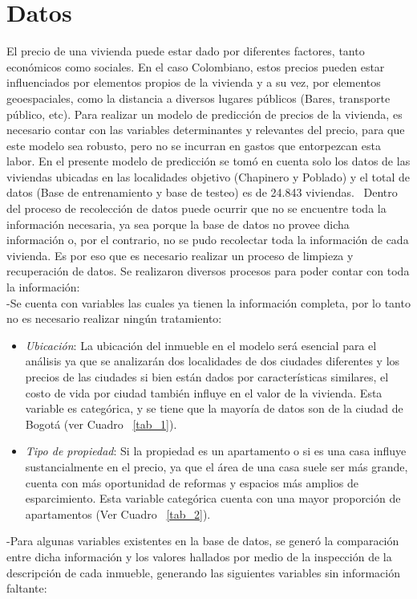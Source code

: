 \documentclass[conference, 10pt]{IEEEtran}
\begin{document}
\section{Datos} \label{AA}

El precio de una vivienda puede estar dado por diferentes factores, tanto económicos como sociales. En el caso Colombiano, estos precios pueden estar influenciados por elementos propios de la vivienda y a su vez, por elementos geoespaciales, como la distancia a diversos lugares públicos (Bares, transporte público, etc). Para realizar un modelo de predicción de precios de la vivienda, es necesario contar con las variables determinantes y relevantes del precio, para que este modelo sea robusto, pero no se incurran en gastos que entorpezcan esta labor. En el presente modelo de predicción se tomó en cuenta solo los datos de  las viviendas ubicadas en las localidades objetivo (Chapinero y Poblado) y el total de datos (Base de entrenamiento y base de testeo) es de 24.843 viviendas. \
Dentro del proceso de recolección de datos puede ocurrir que no se encuentre toda la información necesaria, ya sea porque la base de datos no provee dicha información o, por el contrario, no se pudo recolectar toda la información de cada vivienda. Es por eso que es necesario realizar un proceso de limpieza y recuperación de datos. Se realizaron diversos procesos para poder contar con toda la información:\\ 
-Se cuenta con variables las cuales ya tienen la información completa, por lo tanto no es necesario realizar ningún tratamiento:
\begin{itemize}
\item \textit{Ubicación}: La ubicación del inmueble en el modelo será esencial para el análisis ya que se analizarán dos localidades de dos ciudades diferentes y los precios de las ciudades si bien están dados por características similares, el costo de vida por ciudad también influye en el valor de la vivienda. Esta variable es categórica, y se tiene que la mayoría de datos son de la ciudad de Bogotá (ver Cuadro ~\ref{tab_1}).
\item \textit{Tipo de propiedad}: Si la propiedad es un apartamento o si es una casa influye sustancialmente en el precio, ya que el área de una casa suele ser más grande, cuenta con más oportunidad de reformas y espacios más amplios de esparcimiento. Esta variable categórica cuenta con una mayor proporción de apartamentos (Ver Cuadro ~\ref{tab_2}).
\end{itemize}
-Para algunas variables existentes en la base de datos, se generó la comparación entre dicha información y los valores hallados por medio de la inspección de la descripción de cada inmueble, generando las siguientes variables sin información faltante:
\end{document}

